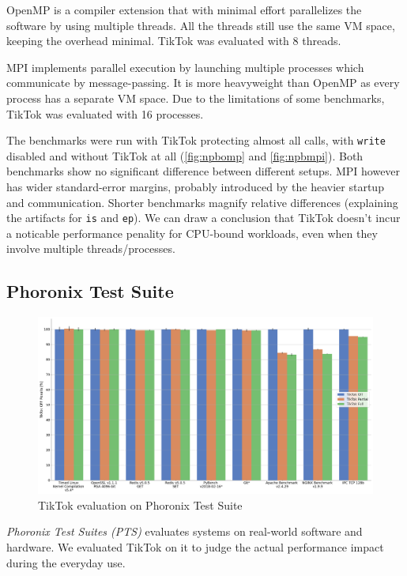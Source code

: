 \documentclass[conference]{IEEEtran}
\newcommand{\sysname}{TikTok}
\begin{document}
OpenMP is a compiler extension that with minimal effort parallelizes the software
by using multiple threads. All the threads still use the same VM space, keeping
the overhead minimal. \sysname{} was evaluated with 8 threads.

MPI implements parallel execution by launching multiple processes which communicate
by message-passing. It is more heavyweight than OpenMP as every process has a
separate VM space. Due to the limitations of some benchmarks, \sysname{} was 
evaluated with 16 processes.

The benchmarks were run with \sysname{} protecting almost all calls, with
\texttt{write} disabled and without \sysname{} at all (\autoref{fig:npbomp} and
\autoref{fig:npbmpi}). Both benchmarks show no significant difference between
different setups. MPI however has wider standard-error margins, probably
introduced by the heavier startup and communication. Shorter benchmarks magnify
relative differences (explaining the artifacts for \texttt{is} and \texttt{ep}).
We can draw a conclusion that \sysname{} doesn't incur a noticable performance
penality for CPU-bound workloads, even when they involve multiple
threads/processes.

\subsection{Phoronix Test Suite}
\label{subsec:phoronix}

\begin{figure}[]
  \centering
  \includegraphics[width=\linewidth]{graphs/phoronix.png}
  \caption{\sysname{} evaluation on Phoronix Test Suite}
  \label{fig:phoronix}
\end{figure}

\emph{Phoronix Test Suites (PTS)} evaluates systems on real-world software and
hardware. We evaluated \sysname{} on it to judge the actual performance impact
during the everyday use.
\end{document}
